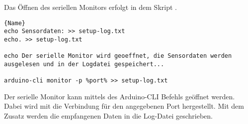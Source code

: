 Das Öffnen des seriellen Monitors erfolgt in dem Skript .

\begin{lstlisting}{Name}
echo Sensordaten: >> setup-log.txt
echo. >> setup-log.txt
    
echo Der serielle Monitor wird geoeffnet, die Sensordaten werden ausgelesen und in der Logdatei gespeichert...
    
arduino-cli monitor -p %port% >> setup-log.txt
\end{lstlisting}	

Der serielle Monitor kann mittels des Arduino-CLI Befehls   geöffnet werden. Dabei wird mit  die Verbindung für den angegebenen Port hergestellt. Mit dem Zusatz  werden die empfangenen Daten in die Log-Datei geschrieben.
